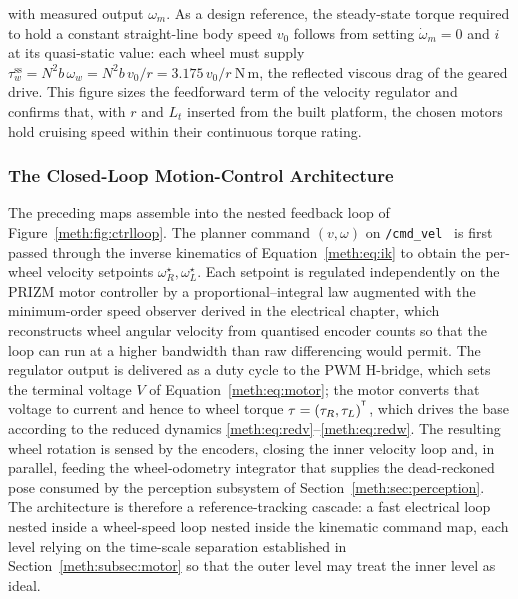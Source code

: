 with measured output $\omega_m$. As a design reference, the steady-state torque required to hold a constant straight-line body speed $v_0$ follows from setting $\dot\omega_m=0$ and $i$ at its quasi-static value: each wheel must supply $\tau_w^{\mathrm{ss}}=N^{2}b\,\omega_w=N^{2}b\,v_0/r=3.175\,v_0/r\ \ensuremath{\mathrm{N\,m}}$, the reflected viscous drag of the geared drive. This figure sizes the feedforward term of the velocity regulator and confirms that, with $r$ and $L_t$ inserted from the built platform, the chosen motors hold cruising speed within their continuous torque rating.

\subsubsection{The Closed-Loop Motion-Control Architecture}\label{meth:subsec:loop}

The preceding maps assemble into the nested feedback loop of Figure~\ref{meth:fig:ctrlloop}. The planner command $(v,\omega)$ on \texttt{/cmd\_vel}~\cite{macenski_2022_ros2,macenski_2020_nav2} is first passed through the inverse kinematics of Equation~\eqref{meth:eq:ik} to obtain the per-wheel velocity setpoints $\omega_R^{\star},\omega_L^{\star}$. Each setpoint is regulated independently on the PRIZM motor controller by a proportional--integral law augmented with the minimum-order speed observer derived in the electrical chapter, which reconstructs wheel angular velocity from quantised encoder counts so that the loop can run at a higher bandwidth than raw differencing would permit. The regulator output is delivered as a duty cycle to the PWM H-bridge, which sets the terminal voltage $V$ of Equation~\eqref{meth:eq:motor}; the motor converts that voltage to current and hence to wheel torque $\tau=(\tau_R,\tau_L)^{^{\mathsf{T}}}$, which drives the base according to the reduced dynamics \eqref{meth:eq:redv}--\eqref{meth:eq:redw}. The resulting wheel rotation is sensed by the encoders, closing the inner velocity loop and, in parallel, feeding the wheel-odometry integrator that supplies the dead-reckoned pose consumed by the perception subsystem of Section~\ref{meth:sec:perception}. The architecture is therefore a reference-tracking cascade: a fast electrical loop nested inside a wheel-speed loop nested inside the kinematic command map, each level relying on the time-scale separation established in Section~\ref{meth:subsec:motor} so that the outer level may treat the inner level as ideal.

